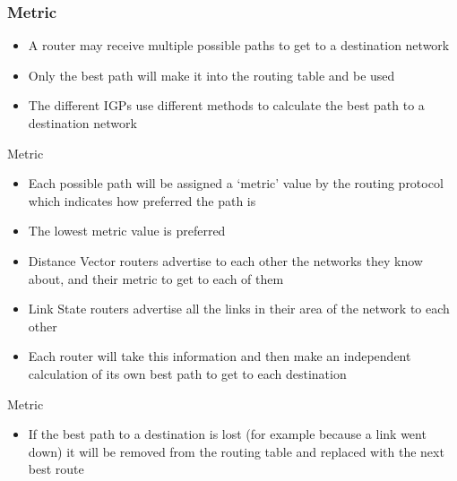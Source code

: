 \documentclass[pdflatex,compress,mathserif]{beamer}
\begin{document}
\begin{frame}
	\frametitle{Metric}
	\begin{itemize}
		\item A router may receive multiple possible paths to get to a destination
network
		\item Only the best path will make it into the routing table and be used
		\item The different IGPs use different methods to calculate the best path to a
destination network
	\end{itemize}
\end{frame}

\begin{frame}{Metric}
	\begin{itemize}
		\item Each possible path will be assigned a ‘metric’ value by the routing
protocol which indicates how preferred the path is
		\item The lowest metric value is preferred
		\item Distance Vector routers advertise to each other the networks they know
about, and their metric to get to each of them
		\item Link State routers advertise all the links in their area of the network to
each other
		\item Each router will take this information and then make an independent
calculation of its own best path to get to each destination
	\end{itemize}
\end{frame}

\begin{frame}{Metric}
	\begin{itemize}
		\item If the best path to a destination is lost (for example because a link went
down) it will be removed from the routing table and replaced with the
next best route
	\end{itemize}
\end{frame}
\end{document}

